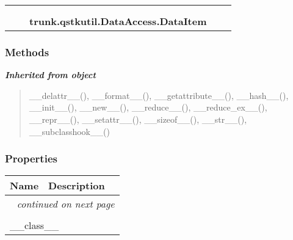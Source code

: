     \label{trunk:qstkutil:DataAccess:DataItem}
\begin{tabular}{cccccc}
\multicolumn{2}{r}{\settowidth{\BCL}{object}\multirow{2}{\BCL}{object}}
&&
  \\\cline{3-3}
  &&\multicolumn{1}{c|}{}
&&
  \\
&&\multicolumn{2}{l}{\textbf{trunk.qstkutil.DataAccess.DataItem}}
\end{tabular}



  \subsubsection{Methods}


\large{\textbf{\textit{Inherited from object}}}

\begin{quote}
\_\_delattr\_\_(), \_\_format\_\_(), \_\_getattribute\_\_(), \_\_hash\_\_(), \_\_init\_\_(), \_\_new\_\_(), \_\_reduce\_\_(), \_\_reduce\_ex\_\_(), \_\_repr\_\_(), \_\_setattr\_\_(), \_\_sizeof\_\_(), \_\_str\_\_(), \_\_subclasshook\_\_()
\end{quote}


  \subsubsection{Properties}

    \vspace{-1cm}
\hspace{\varindent}\begin{longtable}{|p{\varnamewidth}|p{\vardescrwidth}|l}
\cline{1-2}
\cline{1-2} \centering \textbf{Name} & \centering \textbf{Description}& \\
\cline{1-2}
\endhead\cline{1-2}\multicolumn{3}{r}{\small\textit{continued on next page}}\\\endfoot\cline{1-2}
\endlastfoot\multicolumn{2}{|l|}{\textit{Inherited from object}}\\
\multicolumn{2}{|p{\varwidth}|}{\raggedright \_\_class\_\_}\\
\cline{1-2}
\end{longtable}


